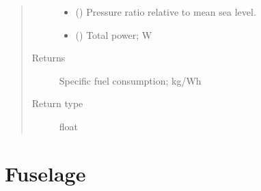 \documentclass[letterpaper,10pt,english]{sphinxmanual}
\begin{document}
\begin{fulllineitems}
\begin{fulllineitems}
\begin{quote}
\begin{description}
\begin{itemize}
\item {} 
\sphinxAtStartPar
{} () \textendash{} Pressure ratio relative to mean sea level.

\item {} 
\sphinxAtStartPar
{} () \textendash{} Total power; W

\end{itemize}

\item[{Returns}] \leavevmode
\sphinxAtStartPar
Specific fuel consumption; kg/Wh

\item[{Return type}] \leavevmode
\sphinxAtStartPar
float

\end{description}\end{quote}

\end{fulllineitems}


\end{fulllineitems}



\section{Fuselage}
\label{\detokenize{modules/fuselage:module-fuselage}}\label{\detokenize{modules/fuselage:fuselage}}\label{\detokenize{modules/fuselage::doc}}
\end{document}
